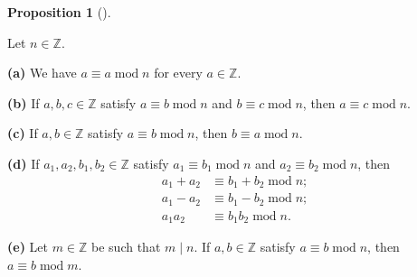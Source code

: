 \documentclass[numbers=enddot,12pt,final,onecolumn,notitlepage]{scrartcl}%
\numberwithin{exer}{subsection}
\theoremstyle{definition}
\newtheorem{prop}[theo]{Proposition}
\newenvironment{proposition}[1][]
{\begin{prop}[#1]\begin{leftbar}}
{\end{leftbar}\end{prop}}
\begin{document}
\begin{proposition}
\label{prop.ent.mod.basics}Let $n\in\mathbb{Z}$.

\textbf{(a)} We have $a\equiv a\operatorname{mod}n$ for every $a\in\mathbb{Z}$.

\textbf{(b)} If $a,b,c\in\mathbb{Z}$ satisfy $a\equiv b\operatorname{mod}n$
and $b\equiv c\operatorname{mod}n$, then $a\equiv c\operatorname{mod}n$.

\textbf{(c)} If $a,b\in\mathbb{Z}$ satisfy $a\equiv b\operatorname{mod}n$,
then $b\equiv a\operatorname{mod}n$.

\textbf{(d)} If $a_{1},a_{2},b_{1},b_{2}\in\mathbb{Z}$ satisfy $a_{1}\equiv
b_{1}\operatorname{mod}n$ and $a_{2}\equiv b_{2}\operatorname{mod}n$, then%
\begin{align}
a_{1}+a_{2}  &  \equiv b_{1}+b_{2}\operatorname{mod}%
n;\label{eq.prop.ent.mod.basics.d.1}\\
a_{1}-a_{2}  &  \equiv b_{1}-b_{2}\operatorname{mod}%
n;\label{eq.prop.ent.mod.basics.d.2}\\
a_{1}a_{2}  &  \equiv b_{1}b_{2}\operatorname{mod}n.
\label{eq.prop.ent.mod.basics.d.3}%
\end{align}


\textbf{(e)} Let $m\in\mathbb{Z}$ be such that $m\mid n$. If $a,b\in
\mathbb{Z}$ satisfy $a\equiv b\operatorname{mod}n$, then $a\equiv
b\operatorname{mod}m$.
\end{proposition}
\end{document}
